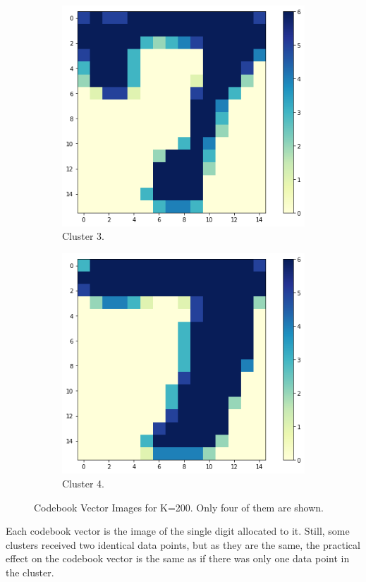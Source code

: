 \documentclass{article}
\begin{document}
\begin{figure}[h!]
\begin{subfigure}[b]{0.4\linewidth}
      \includegraphics[scale=0.4]{images/codebook_cluster4_3.png}
      \caption{Cluster 3.}
    \end{subfigure}\hspace{20.0}%
    \begin{subfigure}[b]{0.4\linewidth}
      \includegraphics[scale=0.4]{images/codebook_cluster4_4.png}
      \caption{Cluster 4.}
    \end{subfigure}
    \caption{Codebook Vector Images for K=200. Only four of them are shown.}
    \label{fig:codebook200}
\end{figure}

Each codebook vector is the image of the single digit allocated to it. Still, some clusters received two identical data points, but as they are the same, the practical effect on the codebook vector is the same as if there was only one data point in the cluster.
\end{document}
